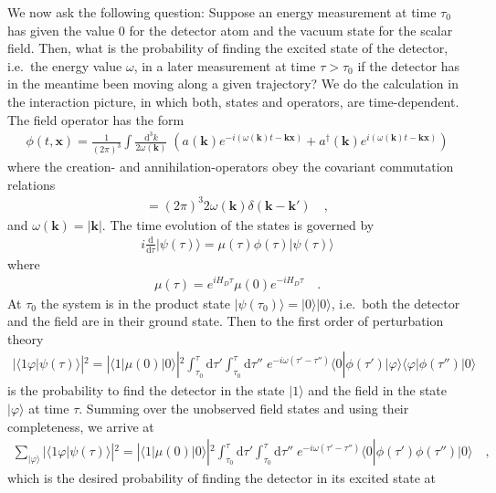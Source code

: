 \documentclass[a4paper,12pt]{article}
\newcommand{\bra}[1]{\langle #1|}
\newcommand{\ket}[1]{|#1\rangle }
\newcommand{\braket}[2]{\langle #1|#2\rangle}
\newcommand{\vx}{\mathbf{x}}
\newcommand{\vk}{\mathbf{k}}
\newcommand{\vac}{\ket{0}}
\newcommand{\cav}{\bra{0}}
\renewcommand{\d}{\mathrm{d}}
\begin{document}
We now ask the following question: Suppose an energy measurement at time
$\tau_0$ has given the value $0$ for the detector atom and the vacuum state for
the scalar field. Then, what is the probability of finding the excited state of
the detector, i.e.\ the energy value $\omega$, in a later measurement at time
$\tau>\tau_0$ if the detector has in the meantime been moving along a given
trajectory?
We do the calculation in the interaction picture, in which both, states and operators,
are time-dependent. The field operator has the form
\begin{eqnarray}
\label{scf}
\phi(t,\vx)=\frac{1}{(2\pi)^3}\int\frac{\d^3k}{2\omega(\vk)}\;
\left(a(\vk)e^{-i(\omega(\vk)t-\vk\vx)}+a^\dag(\vk)e^{i(\omega(\vk)t-\vk\vx)}\right)
\end{eqnarray}
where the creation- and annihilation-operators obey the covariant
commutation relations
\begin{eqnarray*}
[a(\vk),a^\dag(\vk')]=(2\pi)^3 2\omega(\vk)\delta(\vk-\vk')\quad,
\end{eqnarray*}
and $\omega(\vk)=|\vk|$. The time evolution of the states is governed by
\begin{eqnarray*}
i\frac{\d}{\d\tau}\ket{\psi(\tau)}=\mu(\tau)\phi(\tau)\ket{\psi(\tau)}
\end{eqnarray*}
where
\begin{eqnarray*}
\mu(\tau)=e^{iH_D\tau}\mu(0)e^{-iH_D\tau}\quad.
\end{eqnarray*}
At $\tau_0$ the system is in the product state $\ket{\psi(\tau_0)}=\vac\vac$,
i.e.\ both the detector and the field are in their ground state. Then to the first
order of perturbation theory
\begin{eqnarray*}
|\braket{1\varphi}{\psi(\tau)}|^2=|\bra{1}\mu(0)\ket{0}|^2
\int_{\tau_0}^\tau\d\tau'\int_{\tau_0}^\tau\d\tau''\;e^{-i\omega(\tau'-\tau'')}
\cav\phi(\tau')\ket{\varphi}\bra{\varphi}\phi(\tau'')\vac
\end{eqnarray*}
is the probability to find the detector in the state $\ket{1}$ and the
field in the state $\ket{\varphi}$ at time $\tau$. Summing over the unobserved 
field states and using their completeness, we arrive at
\begin{eqnarray*}
\sum_{\ket{\varphi}}|\braket{1\varphi}{\psi(\tau)}|^2=|\bra{1}\mu(0)\ket{0}|^2
\int_{\tau_0}^\tau\d\tau'\int_{\tau_0}^\tau\d\tau''\;e^{-i\omega(\tau'-\tau'')}
\cav\phi(\tau')\phi(\tau'')\vac\quad,
\end{eqnarray*}
which is the desired probability of finding the detector in its excited state at 
\end{document}
